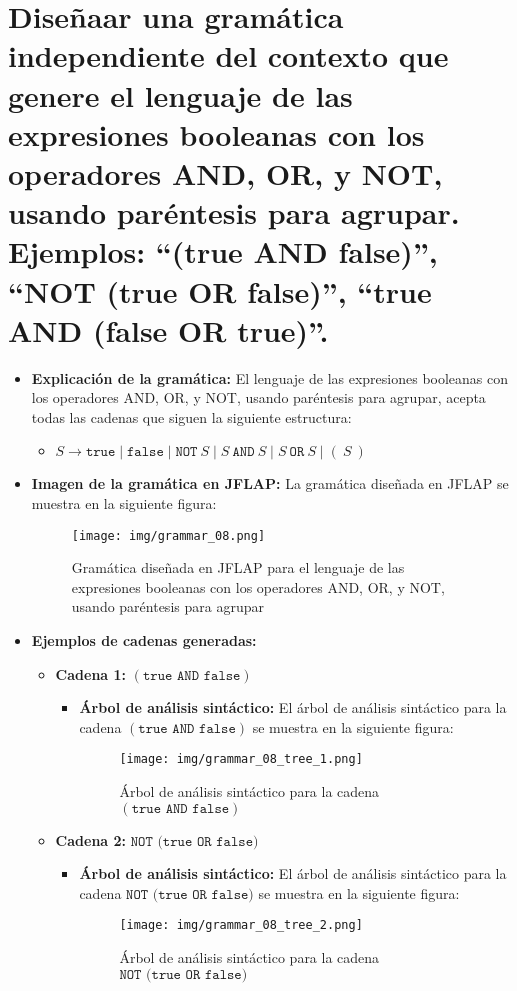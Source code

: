 \documentclass[11pt]{report}
\begin{document}
\section{Diseñaar una gramática independiente del contexto que genere el lenguaje de las expresiones booleanas con los operadores AND, OR, y NOT, usando paréntesis
para agrupar. Ejemplos: “(true AND false)”, “NOT (true OR false)”, “true AND (false OR true)”.}
\begin{itemize}
  \item \textbf{Explicación de la gramática:} El lenguaje de las expresiones booleanas con los operadores AND, OR, y NOT, usando paréntesis para agrupar, acepta todas las cadenas que siguen la siguiente estructura:
  \begin{itemize}
    \item $S \rightarrow \texttt{true} \mid \texttt{false} \mid \texttt{NOT} \ S \mid S \ \texttt{AND} \ S \mid S \ \texttt{OR} \ S \mid (\ S \ )$
  \end{itemize}
  \item \textbf{Imagen de la gramática en JFLAP:} La gramática diseñada en JFLAP se muestra en la siguiente figura:
  \begin{figure}[H]
    \centering
    \texttt{[image: img/grammar\_08.png]}
    \caption{Gramática diseñada en JFLAP para el lenguaje de las expresiones booleanas con los operadores AND, OR, y NOT, usando paréntesis para agrupar}
  \end{figure}
  \item \textbf{Ejemplos de cadenas generadas:}
  \begin{itemize}
    \item \textbf{Cadena 1:} $(\texttt{true AND false})$
    \begin{itemize}
      \item \textbf{Árbol de análisis sintáctico:} El árbol de análisis sintáctico para la cadena $(\texttt{true AND false})$ se muestra en la siguiente figura:
      \begin{figure}[H]
        \centering
        \texttt{[image: img/grammar\_08\_tree\_1.png]}
        \caption{Árbol de análisis sintáctico para la cadena $(\texttt{true AND false})$}
        \label{fig:arbol22}
      \end{figure}
    \end{itemize}
    \item \textbf{Cadena 2:} $\texttt{NOT (true OR false)}$
    \begin{itemize}
      \item \textbf{Árbol de análisis sintáctico:} El árbol de análisis sintáctico para la cadena $\texttt{NOT (true OR false)}$ se muestra en la siguiente figura:
      \begin{figure}[H]
        \centering
        \texttt{[image: img/grammar\_08\_tree\_2.png]}
        \caption{Árbol de análisis sintáctico para la cadena $\texttt{NOT (true OR false)}$}
        \label{fig:arbol23}
      \end{figure}
    \end{itemize}


\end{itemize}
\end{itemize}
\end{document}
